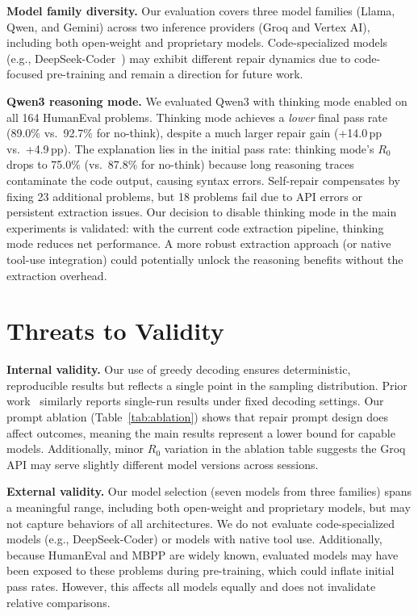 \documentclass[conference]{IEEEtran}
\begin{document}
\textbf{Model family diversity.} Our evaluation covers three model families (Llama, Qwen, and Gemini) across two inference providers (Groq and Vertex AI), including both open-weight and proprietary models. Code-specialized models (e.g., DeepSeek-Coder~\cite{guo2024deepseek}) may exhibit different repair dynamics due to code-focused pre-training and remain a direction for future work.

\textbf{Qwen3 reasoning mode.}
We evaluated Qwen3 with thinking mode enabled on all 164 HumanEval problems. Thinking mode achieves a \emph{lower} final pass rate (89.0\% vs.\ 92.7\% for no-think), despite a much larger repair gain (+14.0\,pp vs.\ +4.9\,pp). The explanation lies in the initial pass rate: thinking mode's $R_0$ drops to 75.0\% (vs.\ 87.8\% for no-think) because long reasoning traces contaminate the code output, causing syntax errors. Self-repair compensates by fixing 23 additional problems, but 18 problems fail due to API errors or persistent extraction issues. Our decision to disable thinking mode in the main experiments is validated: with the current code extraction pipeline, thinking mode reduces net performance. A more robust extraction approach (or native tool-use integration) could potentially unlock the reasoning benefits without the extraction overhead.

\section{Threats to Validity}
\label{sec:threats}

\textbf{Internal validity.}
Our use of greedy decoding ensures deterministic, reproducible results but reflects a single point in the sampling distribution. Prior work~\cite{olausson2024selfrepair, chen2024teaching} similarly reports single-run results under fixed decoding settings. Our prompt ablation (Table~\ref{tab:ablation}) shows that repair prompt design does affect outcomes, meaning the main results represent a lower bound for capable models. Additionally, minor $R_0$ variation in the ablation table suggests the Groq API may serve slightly different model versions across sessions.

\textbf{External validity.}
Our model selection (seven models from three families) spans a meaningful range, including both open-weight and proprietary models, but may not capture behaviors of all architectures. We do not evaluate code-specialized models (e.g., DeepSeek-Coder) or models with native tool use. Additionally, because HumanEval and MBPP are widely known, evaluated models may have been exposed to these problems during pre-training, which could inflate initial pass rates. However, this affects all models equally and does not invalidate relative comparisons.
\end{document}

